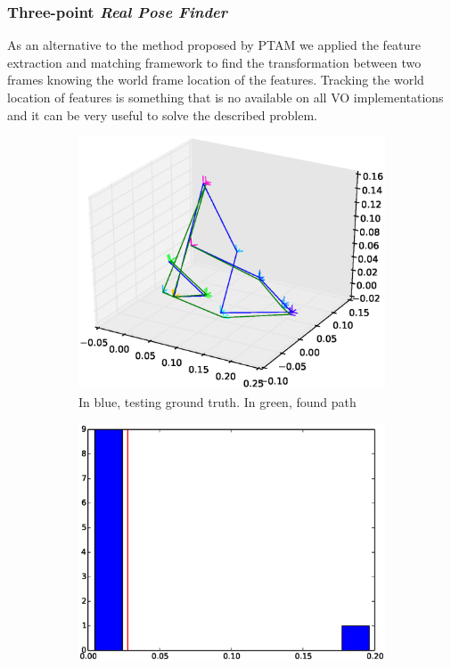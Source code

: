 \subsubsection{Three-point \textit{Real Pose Finder}}
\label{ssub:three_point_real_pose_finder}

As an alternative to the method proposed by PTAM we applied the feature extraction and matching framework to find the transformation between two frames knowing the world frame location of the features. Tracking the world location of features is something that is no available on all VO implementations and it can be very useful to solve the described problem.\\

\begin{figure}[htpb]
  \begin{subfigure}[b]{6cm}
          \includegraphics[width=\linewidth]{img/desktop_2_naive_3pt_path_1.eps}
          \caption{In blue, testing ground truth. In green, found path}                
          \label{fig:desktop_2_naive_3pt_path_1}
  \end{subfigure}   
  \qquad
  \begin{subfigure}[b]{6cm}
          \includegraphics[width=\linewidth]{img/desktop_2_naive_3pt_dist_1.eps}

\end{subfigure}
\end{figure}
